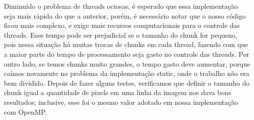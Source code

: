 \documentclass[12pt]{article}
\begin{document}
Diminuído o problema de threads ociosas, é esperado que essa 
implementação seja mais rápida do que a anterior, porém, é necessário 
notar que o nosso código ficou mais complexo, e exige mais recursos
computacionais para o controle das threads. Esse tempo pode ser 
prejudicial se o tamanho do chunk for pequeno, pois nessa situação
há muitas trocas de chunks em cada thread, fazendo com que a maior parte
do tempo de processamento seja gasto no controle das threads. Por outro
lado, se temos chunks muito grandes, o tempo gasto deve aumentar, porque
caímos novamente no problema da implementação static, onde o trabalho 
não era bem dividido. Depois de fazer alguns testes, verificamos 
que definir o tamanho do chunk igual a quantidade de pixels em uma linha
da imagem nos dava bons resultados; inclusive, esse foi o mesmo valor 
adotado em nossa implementação com OpenMP.
\end{document}
